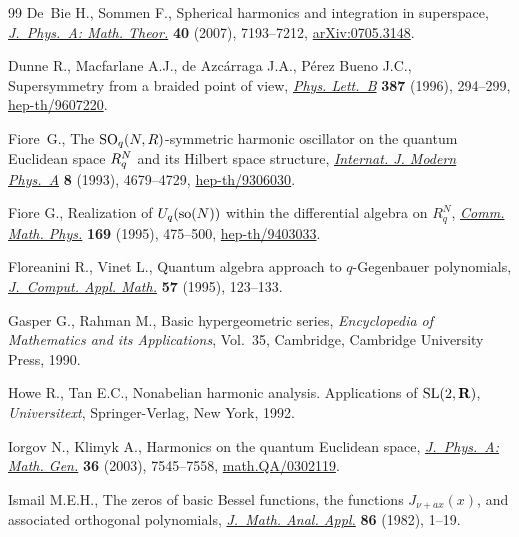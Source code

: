 \documentclass[11pt]{article}
\numberwithin{equation}{section}
\begin{document}
\begin{thebibliography}{99}
De~Bie H., Sommen F.,
Spherical harmonics and integration in superspace,
\href{http://dx.doi.org/10.1088/1751-8113/40/26/007}{{\it J.~Phys.~A: Math. Theor.}} {\bf 40} (2007), 7193--7212,
\href{http://arxiv.org/abs/0705.3148}{arXiv:0705.3148}.

Dunne R., Macfarlane A.J., de Azc\'arraga J.A., P\'erez Bueno J.C.,
Supersymmetry from a braided point of view,
\href{http://dx.doi.org/10.1016/0370-2693(96)01032-5}{{\it Phys. Lett.~B}} {\bf387} (1996), 294--299,
\href{http://arxiv.org/abs/hep-th/9607220}{hep-th/9607220}.

Fiore~G.,
The ${\rm SO}\sb q(N,R)$-symmetric harmonic oscillator on the quantum Euclidean space $R\sp N\sb q$ and its Hilbert space structure,
\href{http://dx.doi.org/10.1142/S0217751X93001880}{{\it Internat. J. Modern Phys.~A}} {\bf 8} (1993), 4679--4729,
\href{http://arxiv.org/abs/hep-th/9306030}{hep-th/9306030}.

Fiore G.,
Realization of $U_q({\rm so}(N))$ within the dif\/ferential algebra on $R^N_q$,
\href{http://dx.doi.org/10.1007/BF02099309}{{\it Comm. Math. Phys.}} {\bf 169} (1995), 475--500,
\href{http://arxiv.org/abs/hep-th/9403033}{hep-th/9403033}.

Floreanini R., Vinet L.,
Quantum algebra approach to $q$-Gegenbauer polynomials,
\href{http://dx.doi.org/10.1016/0377-0427(93)E0239-I}{{\it J.~Comput. Appl. Math.}} {\bf57} (1995), 123--133.


Gasper G., Rahman M.,
Basic hypergeometric series,
{\it Encyclopedia of Mathematics and its Applications}, Vol.~35, Cambridge, Cambridge University Press, 1990.

Howe R., Tan E.C.,
Nonabelian harmonic analysis. Applications of ${\rm SL}(2,{\bf R})$,
{\it Universitext}, Springer-Verlag, New York, 1992.


Iorgov N., Klimyk A.,
Harmonics on the quantum Euclidean space,
\href{http://dx.doi.org/10.1088/0305-4470/36/27/307}{{\it J.~Phys.~A: Math. Gen.}} {\bf 36} (2003), 7545--7558,
\href{http://arxiv.org/abs/math.QA/0302119}{math.QA/0302119}.

Ismail M.E.H.,
The zeros of basic Bessel functions, the functions $J_{\nu +ax}(x)$, and associated orthogonal polynomials,
\href{http://dx.doi.org/10.1016/0022-247X(82)90248-7}{{\it J.~Math. Anal. Appl.}} {\bf86} (1982), 1--19.



\end{thebibliography}
\end{document}
